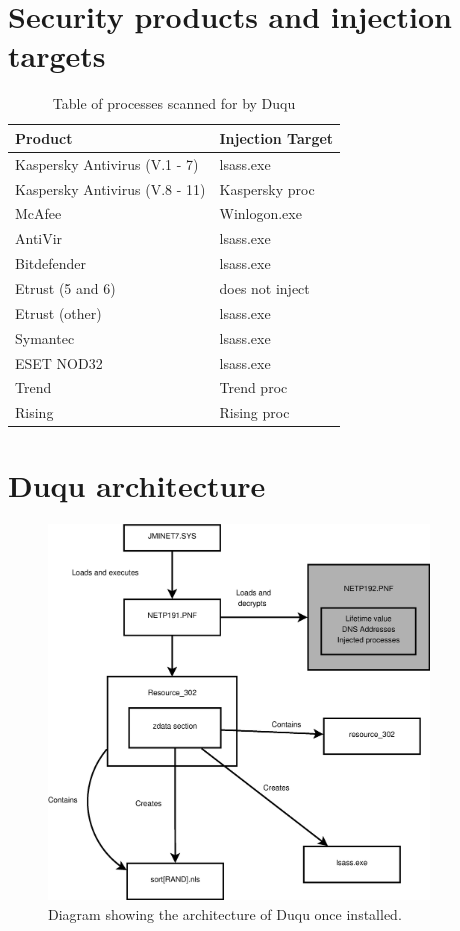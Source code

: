 \documentclass[11pt,english,a4paper]{report}
\begin{document}
\begin{appendices}
\chapter{Security products and injection targets} \label{app:injection_targets}
    \begin{table}[h]
        \caption{Table of processes scanned for by Duqu \cite{DUQU_SYMANTEC}}
        \begin{tabular}{|l|l|}
        \hline
        \cellcolor[gray]{0.8} Product & \cellcolor[gray]{0.8} Injection Target \\ \hline
        Kaspersky Antivirus (V.1 - 7) & lsass.exe \\ \hline
        Kaspersky Antivirus (V.8 - 11) & Kaspersky proc \\ \hline
        McAfee & Winlogon.exe \\ \hline
        AntiVir & lsass.exe \\ \hline
        Bitdefender & lsass.exe \\ \hline
        Etrust (5 and 6) & does not inject \\ \hline
        Etrust (other) & lsass.exe \\ \hline
        Symantec & lsass.exe \\ \hline
        ESET NOD32 & lsass.exe \\ \hline
        Trend & Trend proc \\ \hline
        Rising & Rising proc \\ \hline
        \end{tabular}
      \end{table}

  \chapter{Duqu architecture} \label{app:duqu_arc}
    \begin{figure}[hb]
      \centering
      \includegraphics[width=0.90\textwidth]{duqu_arc.eps}
      \caption[File system anatomy] {Diagram showing the architecture of Duqu once installed. \cite{DUQU_SYMANTEC}} 
    \end{figure}

\end{appendices}

\newpage
\printbibliography[title={Complete Bibliography},heading=bibintoc]
\end{document}
